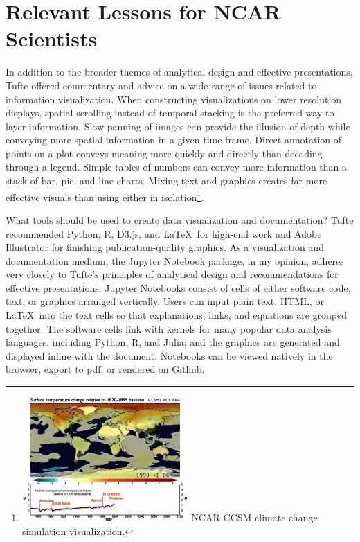 \documentclass{tufte-handout}
\begin{document}
\section{Relevant Lessons for NCAR Scientists}
In addition to the broader themes of analytical design and effective presentations, Tufte offered commentary and advice on a wide range of issues related to information visualization. When constructing visualizations on lower resolution displays, spatial scrolling instead of temporal stacking is the preferred way to layer information. Slow panning of images can provide the illusion of depth while conveying more spatial information in a given time frame. Direct annotation of points on a plot conveys meaning more quickly and directly than decoding through a legend. Simple tables of numbers can convey more information than a stack of bar, pie, and line charts. Mixing text and graphics creates far more effective visuals than using either in isolation\footnote{\includegraphics[width=2.5in]{ccsm_video.png} NCAR CCSM climate change simulation visualization.}. 

What tools should be used to create data visualization and documentation? Tufte recommended Python, R, D3.js, and \LaTeX ~for high-end work and Adobe Illustrator for finishing publication-quality graphics. As a visualization and documentation medium, the Jupyter Notebook package, in my opinion, adheres very closely to Tufte's principles of analytical design and recommendations for effective presentations. Jupyter Notebooks consist of cells of either software code, text, or graphics arranged vertically. Users can input plain text, HTML, or \LaTeX ~into the text cells so that explanations, links, and equations are grouped together. The software cells link with kernels for many popular data analysis languages, including Python, R, and Julia; and the graphics are generated and displayed inline with the document. Notebooks can be viewed natively in the browser, export to pdf, or rendered on Github.
\end{document}
